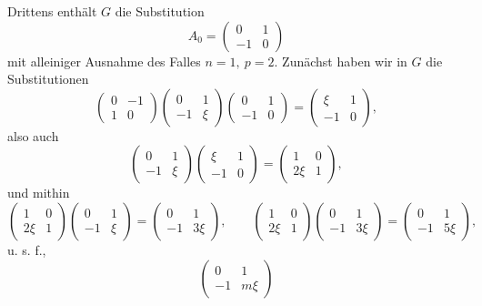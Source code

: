 \documentclass[11pt]{article}
\begin{document}
Drittens enthält $G$ die Substitution
\[
 A_0=\begin{pmatrix}0&1\\-1&0\end{pmatrix}
\]
mit alleiniger Ausnahme des Falles $n=1,\ p=2$. Zunächst haben wir in $G$ die Substitutionen
\[
 \begin{pmatrix}0&-1\\1&0\end{pmatrix}
 \begin{pmatrix}0&1\\-1&\xi\end{pmatrix}
 \begin{pmatrix}0&1\\-1&0\end{pmatrix}
 =
 \begin{pmatrix}\xi&1\\-1&0\end{pmatrix},
\]
also auch
\[
 \begin{pmatrix}0&1\\-1&\xi\end{pmatrix}
 \begin{pmatrix}\xi&1\\-1&0\end{pmatrix}
 =
 \begin{pmatrix}1&0\\2\xi&1\end{pmatrix},
\]
und mithin
\[
 \begin{pmatrix}1&0\\2\xi&1\end{pmatrix}
 \begin{pmatrix}0&1\\-1&\xi\end{pmatrix}
 =
 \begin{pmatrix}0&1\\-1&3\xi\end{pmatrix},\qquad
 \begin{pmatrix}1&0\\2\xi&1\end{pmatrix}
 \begin{pmatrix}0&1\\-1&3\xi\end{pmatrix}
 =
 \begin{pmatrix}0&1\\-1&5\xi\end{pmatrix},
\]
u. s. f.,
\[
 \begin{pmatrix}0&1\\-1&m\xi\end{pmatrix}
\]
\end{document}
